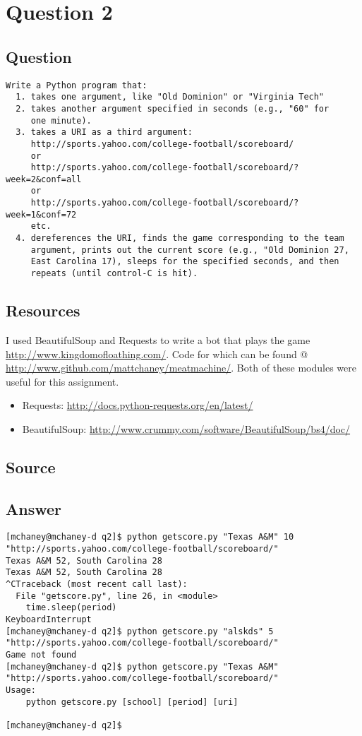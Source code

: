 \section{Question 2}

\subsection{Question}
\begin{verbatim}
Write a Python program that:
  1. takes one argument, like "Old Dominion" or "Virginia Tech"
  2. takes another argument specified in seconds (e.g., "60" for 
     one minute).
  3. takes a URI as a third argument: 
     http://sports.yahoo.com/college-football/scoreboard/
     or
     http://sports.yahoo.com/college-football/scoreboard/?week=2&conf=all
     or
     http://sports.yahoo.com/college-football/scoreboard/?week=1&conf=72
     etc.
  4. dereferences the URI, finds the game corresponding to the team
     argument, prints out the current score (e.g., "Old Dominion 27, 
     East Carolina 17), sleeps for the specified seconds, and then
     repeats (until control-C is hit).
\end{verbatim}

\subsection{Resources}
I used BeautifulSoup and Requests to write a bot that plays the game \url{http://www.kingdomofloathing.com/}.
Code for which can be found @ \url{http://www.github.com/mattchaney/meatmachine/}.
Both of these modules were useful for this assignment. 

\begin{itemize}
\item Requests: \url{http://docs.python-requests.org/en/latest/}
\item BeautifulSoup: \url{http://www.crummy.com/software/BeautifulSoup/bs4/doc/}
\end{itemize}

\subsection{Source}
\lstset{
	language=Python,
}


\subsection{Answer}
\lstset{
	language=Bash,
}
\begin{lstlisting}
[mchaney@mchaney-d q2]$ python getscore.py "Texas A&M" 10 "http://sports.yahoo.com/college-football/scoreboard/"
Texas A&M 52, South Carolina 28
Texas A&M 52, South Carolina 28
^CTraceback (most recent call last):
  File "getscore.py", line 26, in <module>
    time.sleep(period)
KeyboardInterrupt
[mchaney@mchaney-d q2]$ python getscore.py "alskds" 5 "http://sports.yahoo.com/college-football/scoreboard/"
Game not found
[mchaney@mchaney-d q2]$ python getscore.py "Texas A&M" "http://sports.yahoo.com/college-football/scoreboard/"
Usage:
	python getscore.py [school] [period] [uri]

[mchaney@mchaney-d q2]$
\end{lstlisting}